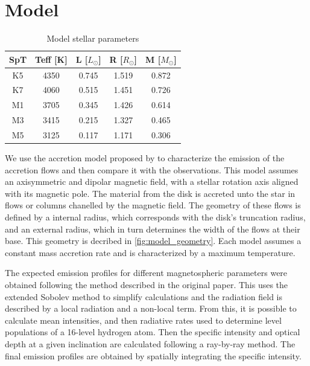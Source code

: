 \documentclass[twocolumn,linenumbers]{aastex631}
\begin{document}
\section{Model} \label{Models}

\begin{table}
\centering
\caption{Model stellar parameters}
\begin{tabular}{ccccc}
\hline
SpT & Teff {[}K{]} & L {[}$L_{\odot}${]} & R {[}$R_{\odot}${]} & M {[}$M_{\odot}${]} \\ \hline
K5  & 4350         & 0.745               & 1.519               & 0.872               \\
K7  & 4060         & 0.515               & 1.451               & 0.726               \\
M1  & 3705         & 0.345               & 1.426               & 0.614               \\
M3  & 3415         & 0.215               & 1.327               & 0.465               \\
M5  & 3125         & 0.117               & 1.171               & 0.306               \\ \hline
\end{tabular}
\label{table:parametros_modelos}
\end{table}

We use the accretion model proposed by \citet{muzerolle2001} to characterize the emission of the accretion flows and then compare it with the observations. This model assumes an axisymmetric and dipolar magnetic field, with a stellar rotation axis aligned with its magnetic pole. The material from the disk is accreted unto the star in flows or columns chanelled by the magnetic field. The geometry of these flows is defined by a internal radius, which corresponds with the disk's truncation radius, and an external radius, which  in turn determines the width of the flows at their base. This geometry is decribed in  \ref{fig:model_geometry}. Each model assumes a constant mass accretion rate and is characterized by a maximum temperature.

The expected emission profiles for different magnetospheric parameters were obtained following the method described in the original paper. This uses the extended Sobolev method to simplify calculations and the radiation field is described by a local radiation and a non-local term. From this, it is possible to calculate mean intensities, and then radiative rates used to determine level populations of a 16-level hydrogen atom. Then the specific intensity and optical depth at a given inclination are calculated following a ray-by-ray method. The final emission profiles are obtained by spatially integrating the specific intensity.
\end{document}
